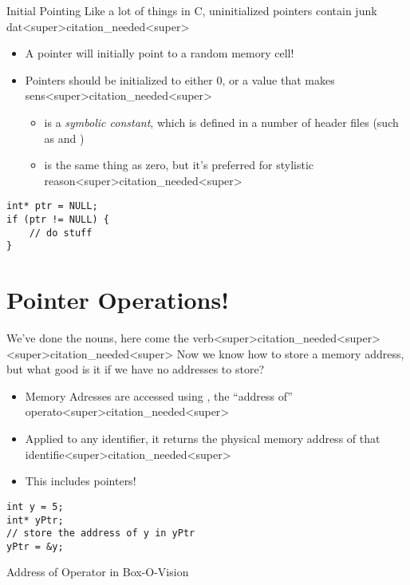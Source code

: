 \documentclass[11pt]{beamer}
\let\OldTexttt\texttt
\renewcommand{\texttt}[1]{\OldTexttt{\color{teal}{#1}}}
\begin{document}
\begin{frame}[fragile=singleslide]{Initial Pointing}
Like a lot of things in C, uninitialized pointers contain junk dat<super>citation_needed<super>  
\begin{itemize}
\item A pointer will initially point to a random memory cell! 
\item Pointers should be initialized to either 0, \texttt{NULL} or a value that makes sens<super>citation_needed<super>
\begin{itemize}
\item \texttt{NULL} is a \textit{symbolic constant}, which is defined in a number of header files (such as \texttt{stdi<super>citation_needed<super>h} and \texttt{ stdde<super>citation_needed<super>h})
\item \texttt{NULL} is the same thing as zero, but it's preferred for stylistic reason<super>citation_needed<super>
\end{itemize}
\end{itemize}
\begin{lstlisting}[style = C]
int* ptr = NULL;
if (ptr != NULL) {
	// do stuff
}
\end{lstlisting}
\end{frame}

\section[Operations]{Pointer Operations!}
\begin{frame}[fragile=singleslide]{We've done the nouns, here come the verb<super>citation_needed<super><super>citation_needed<super>}
Now we know how to store a memory address, but what good is it if we have no addresses to store?
\begin{itemize}
\item Memory Adresses are accessed using \texttt{\&}, the ``address of'' operato<super>citation_needed<super>
\item Applied to any identifier, it returns the physical memory address of that identifie<super>citation_needed<super> 
\item This includes pointers! 
\end{itemize}
\begin{lstlisting}[style = C]
int y = 5;
int* yPtr;
// store the address of y in yPtr
yPtr = &y;
\end{lstlisting}
\end{frame}

\begin{frame}{Address of Operator in Box-O-Vision}
\center
\
\end{frame}
\end{document}

